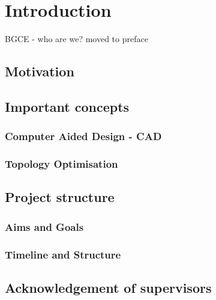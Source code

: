 \chapter{Introduction}
\label{chapter:Introduction}


 BGCE - who are we? moved to preface
\section{Motivation}


\section{Important concepts}

\subsection{Computer Aided Design - CAD}

\subsection{Topology Optimisation}

\section{Project structure}
\subsection{Aims and Goals}
\subsection{Timeline and Structure}

\section{Acknowledgement of supervisors}



